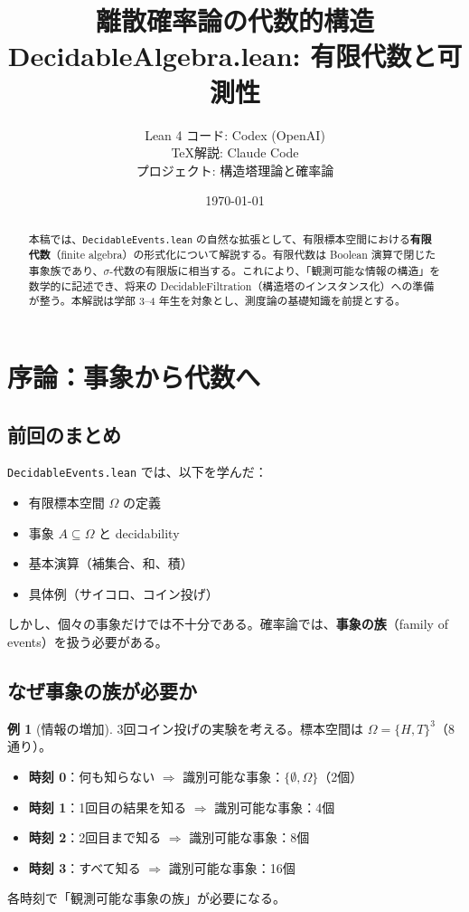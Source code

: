 \documentclass[12pt,a4paper,ja=standard]{bxjsarticle}
\title{\Huge\bfseries 離散確率論の代数的構造\\
\Large DecidableAlgebra.lean: 有限代数と可測性}
\author{
    \large Lean 4 コード: Codex (OpenAI) \\
    \large \TeX 解説: Claude Code \\
    \vspace{0.3cm}
    \normalsize プロジェクト: 構造塔理論と確率論
}
\date{\today}
\theoremstyle{definition}
\newtheorem{example}[definition]{例}
\begin{document}
\maketitle

\begin{abstract}
本稿では、\texttt{DecidableEvents.lean} の自然な拡張として、有限標本空間における\textbf{有限代数}（finite algebra）の形式化について解説する。有限代数は Boolean 演算で閉じた事象族であり、$\sigma$-代数の有限版に相当する。これにより、「観測可能な情報の構造」を数学的に記述でき、将来の DecidableFiltration（構造塔のインスタンス化）への準備が整う。本解説は学部 3--4 年生を対象とし、測度論の基礎知識を前提とする。
\end{abstract}

\tableofcontents
\newpage

\section{序論：事象から代数へ}

\subsection{前回のまとめ}

\texttt{DecidableEvents.lean} では、以下を学んだ：

\begin{itemize}
    \item 有限標本空間 $\Omega$ の定義
    \item 事象 $A \subseteq \Omega$ と decidability
    \item 基本演算（補集合、和、積）
    \item 具体例（サイコロ、コイン投げ）
\end{itemize}

しかし、個々の事象だけでは不十分である。確率論では、\textbf{事象の族}（family of events）を扱う必要がある。

\subsection{なぜ事象の族が必要か}

\begin{example}[情報の増加]
3回コイン投げの実験を考える。標本空間は $\Omega = \{H, T\}^3$（8通り）。

\begin{itemize}
    \item \textbf{時刻 0}：何も知らない $\Rightarrow$ 識別可能な事象：$\{\emptyset, \Omega\}$（2個）
    \item \textbf{時刻 1}：1回目の結果を知る $\Rightarrow$ 識別可能な事象：4個
    \item \textbf{時刻 2}：2回目まで知る $\Rightarrow$ 識別可能な事象：8個
    \item \textbf{時刻 3}：すべて知る $\Rightarrow$ 識別可能な事象：16個
\end{itemize}

各時刻で「観測可能な事象の族」が必要になる。
\end{example}
\end{document}
